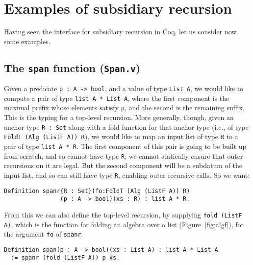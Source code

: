 \documentclass[a4paper,USenglish]{lipics-v2021}
\begin{document}
\section{Examples of subsidiary recursion}
\label{sec:examples}

Having seen the interface for subsidiary recursion in Coq, let us
consider now some examples.

\subsection{The \texttt{span} function (\texttt{Span.v})}

Given a predicate \verb|p : A -> bool|, and a value of type
\verb|List A|, we would like to compute a pair of type
\verb|list A * List A|, where the first component is the maximal
prefix whose elements satisfy \verb|p|, and the second is the
remaining suffix.  This is the typing for a top-level recursion.  More
generally, though, given an anchor type \verb|R : Set| along with a
fold function for that anchor type (i.e., of type \verb|FoldT (Alg (ListF A)) R|),
we would like to map an input list of type \verb|R| to a pair of
type \verb|list A * R|.  The first component of this pair is
going to be built up from scratch, and so cannot have type \verb|R|;
we cannot statically ensure that outer recursions on it are legal.
But the second component will be a subdatum of the input list,
and so can still have type \verb|R|, enabling outer recursive calls.  So we want: 
\begin{verbatim}
Definition spanr{R : Set}(fo:FoldT (Alg (ListF A)) R)
                (p : A -> bool)(xs : R) : list A * R.
\end{verbatim}
\noindent From this we can also define the top-level recursion, by
supplying \verb|fold (ListF A)|, which is the function for folding an algebra
over a list (Figure~\ref{fig:algf}), for the argument \verb|fo| of \verb|spanr|:
\begin{verbatim}
Definition span(p : A -> bool)(xs : List A) : list A * List A
  := spanr (fold (ListF A)) p xs.
\end{verbatim} 
\end{document}
